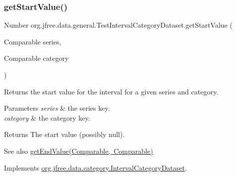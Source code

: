 \mbox{\label{classorg_1_1jfree_1_1data_1_1general_1_1_test_interval_category_dataset_ae3ea72c7a63af5350adc3eb94ac6d006}} 
\subsubsection{\texorpdfstring{get\+Start\+Value()}{getStartValue()}\hspace{0.1cm}{\footnotesize\ttfamily [2/2]}}
{\footnotesize\ttfamily Number org.\+jfree.\+data.\+general.\+Test\+Interval\+Category\+Dataset.\+get\+Start\+Value (\begin{DoxyParamCaption}\item[{Comparable}]{series,  }\item[{Comparable}]{category }\end{DoxyParamCaption})}

Returns the start value for the interval for a given series and category.


\begin{DoxyParams}{Parameters}
{\em series} & the series key. \\
\hline
{\em category} & the category key.\\
\hline
\end{DoxyParams}
\begin{DoxyReturn}{Returns}
The start value (possibly {\ttfamily null}).
\end{DoxyReturn}
\begin{DoxySeeAlso}{See also}
\mbox{\hyperlink{classorg_1_1jfree_1_1data_1_1general_1_1_test_interval_category_dataset_a595f5ee7d09a4215b9e0b006161894c9}{get\+End\+Value(\+Comparable, Comparable)}} 
\end{DoxySeeAlso}


Implements \mbox{\hyperlink{interfaceorg_1_1jfree_1_1data_1_1category_1_1_interval_category_dataset_aec932dc7f50bf72be26002494a266e2e}{org.\+jfree.\+data.\+category.\+Interval\+Category\+Dataset}}.

\mbox{\label{classorg_1_1jfree_1_1data_1_1general_1_1_test_interval_category_dataset_aae33ee91dff2730d64a95434a47b1e5f}} 
